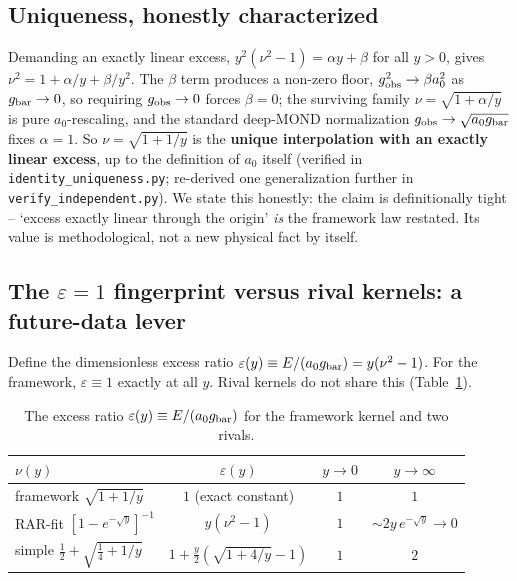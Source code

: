 \documentclass[fleqn,usenatbib]{mnras}
\begin{document}
\subsection{Uniqueness, honestly characterized}
\label{sec:unique}

Demanding an exactly linear excess, $y^2(\nu^2-1)=\alpha y+\beta$ for all $y>0$, gives $\nu^2=1+\alpha/y+\beta/y^2$. The $\beta$ term produces a non-zero floor, $g_{\rm obs}^2\to\beta a_0^2$ as $g_{\rm bar}\to0$, so requiring $g_{\rm obs}\to0$ forces $\beta=0$; the surviving family $\nu=\sqrt{1+\alpha/y}$ is pure $a_0$-rescaling, and the standard deep-MOND normalization $g_{\rm obs}\to\sqrt{a_0 g_{\rm bar}}$ fixes $\alpha=1$. So $\nu=\sqrt{1+1/y}$ is the \textbf{unique interpolation with an exactly linear excess}, up to the definition of $a_0$ itself (verified in \texttt{identity\_uniqueness.py}; re-derived one generalization further in \texttt{verify\_independent.py}). We state this honestly: the claim is definitionally tight -- `excess exactly linear through the origin' \emph{is} the framework law restated. Its value is methodological, not a new physical fact by itself.

\subsection{The $\varepsilon=1$ fingerprint versus rival kernels: a future-data lever}
\label{sec:fingerprint}

Define the dimensionless excess ratio $\varepsilon(y)\equiv E/(a_0 g_{\rm bar})=y(\nu^2-1)$. For the framework, $\varepsilon\equiv1$ exactly at all $y$. Rival kernels do not share this (Table~\ref{tab:kernels}).

\begin{table}
\centering
\caption{The excess ratio $\varepsilon(y)\equiv E/(a_0 g_{\rm bar})$ for the framework kernel and two rivals.}
\label{tab:kernels}
\setlength{\tabcolsep}{2pt}
\footnotesize
\begin{tabular}{lccc}
\hline
$\nu(y)$ & $\varepsilon(y)$ & $y\to0$ & $y\to\infty$ \\
\hline
framework $\sqrt{1+1/y}$ & $1$ (exact constant) & $1$ & $1$ \\
RAR-fit $[1-e^{-\sqrt y}]^{-1}$ & $y(\nu^2-1)$ & $1$ & ${\sim}2y\,e^{-\sqrt y}\to0$ \\
simple $\tfrac12+\sqrt{\tfrac14+1/y}$ & $1+\tfrac y2(\sqrt{1+4/y}-1)$ & $1$ & $2$ \\
\hline
\end{tabular}
\end{table}
\end{document}

